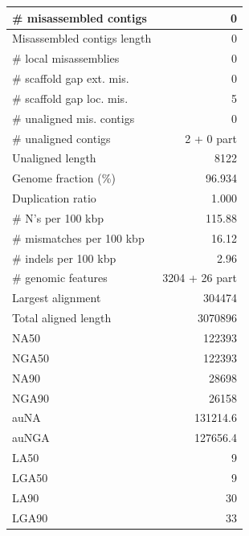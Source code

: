 \documentclass[12pt,a4paper]{article}
\begin{document}
\begin{table}[ht]
\begin{center}
\begin{tabular}{|l*{1}{|r}|}
\# misassembled contigs & 0 \\ \hline
Misassembled contigs length & 0 \\ \hline
\# local misassemblies & 0 \\ \hline
\# scaffold gap ext. mis. & 0 \\ \hline
\# scaffold gap loc. mis. & 5 \\ \hline
\# unaligned mis. contigs & 0 \\ \hline
\# unaligned contigs & 2 + 0 part \\ \hline
Unaligned length & 8122 \\ \hline
Genome fraction (\%) & 96.934 \\ \hline
Duplication ratio & 1.000 \\ \hline
\# N's per 100 kbp & 115.88 \\ \hline
\# mismatches per 100 kbp & 16.12 \\ \hline
\# indels per 100 kbp & 2.96 \\ \hline
\# genomic features & 3204 + 26 part \\ \hline
Largest alignment & 304474 \\ \hline
Total aligned length & 3070896 \\ \hline
NA50 & 122393 \\ \hline
NGA50 & 122393 \\ \hline
NA90 & 28698 \\ \hline
NGA90 & 26158 \\ \hline
auNA & 131214.6 \\ \hline
auNGA & 127656.4 \\ \hline
LA50 & 9 \\ \hline
LGA50 & 9 \\ \hline
LA90 & 30 \\ \hline
LGA90 & 33 \\ \hline
\end{tabular}
\end{center}
\end{table}
\end{document}
